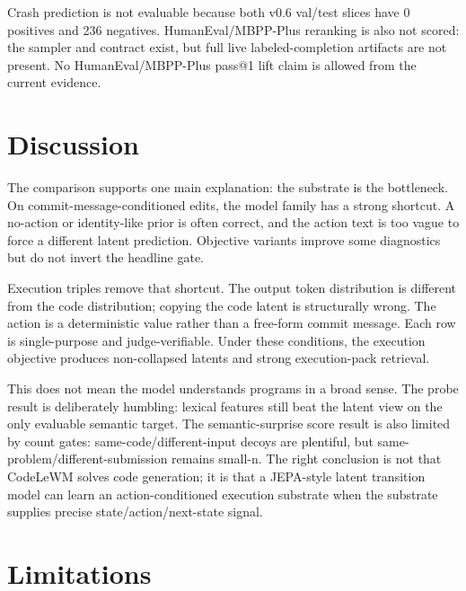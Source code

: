 \documentclass[11pt]{article}
\newcommand{\artifact}[1]{\path{#1}}
\newcommand{\modelname}{CodeLeWM}
\begin{document}
Crash prediction is not evaluable because both v0.6 val/test slices have
0 positives and 236 negatives. HumanEval/MBPP-Plus reranking is also not
scored: the sampler and
\artifact{codelewm.eval.completion_label.v1} contract exist, but full live
labeled-completion artifacts are not present. No HumanEval/MBPP-Plus pass@1
lift claim is allowed from the current evidence.

\section{Discussion}

The comparison supports one main explanation: the substrate is the bottleneck.
On commit-message-conditioned edits, the model family has a strong shortcut. A
no-action or identity-like prior is often correct, and the action text is too
vague to force a different latent prediction. Objective variants improve some
diagnostics but do not invert the headline gate.

Execution triples remove that shortcut. The output token distribution is
different from the code distribution; copying the code latent is structurally
wrong. The action is a deterministic value rather than a free-form commit
message. Each row is single-purpose and judge-verifiable. Under these
conditions, the execution objective produces non-collapsed latents and strong
execution-pack retrieval.

This does not mean the model understands programs in a broad sense. The probe
result is deliberately humbling: lexical features still beat the latent view on
the only evaluable semantic target. The semantic-surprise score result is also
limited by count gates: same-code/different-input decoys are plentiful, but
same-problem/different-submission remains small-n. The right conclusion is not
that \modelname{} solves code generation; it is that a JEPA-style latent
transition model can learn an action-conditioned execution substrate when the
substrate supplies precise state/action/next-state signal.

\section{Limitations}
\end{document}
